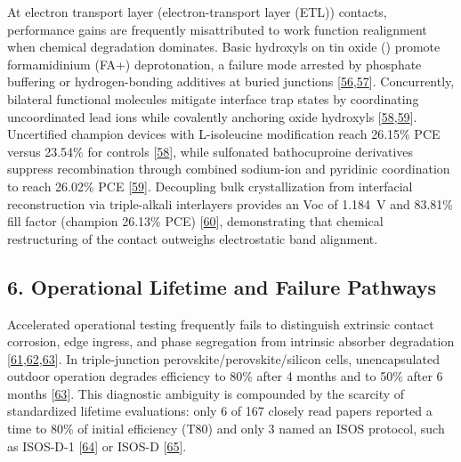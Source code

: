 \documentclass[
  11pt,
]{article}
\begin{document}
At electron transport layer (electron-transport layer (ETL)) contacts,
performance gains are frequently misattributed to work function
realignment when chemical degradation dominates. Basic hydroxyls on tin
oxide () promote formamidinium (FA+) deprotonation, a failure
mode arrested by phosphate buffering or hydrogen-bonding additives at
buried junctions
{[}\href{https://doi.org/10.1002/aenm.71170}{56},\href{https://doi.org/10.1021/acssuschemeng.6c04546}{57}{]}.
Concurrently, bilateral functional molecules mitigate interface trap
states by coordinating uncoordinated lead ions while covalently
anchoring oxide hydroxyls
{[}\href{https://doi.org/10.1002/smll.202510785}{58},\href{https://doi.org/10.1002/advs.76010}{59}{]}.
Uncertified champion devices with L-isoleucine modification reach
26.15\% PCE versus 23.54\% for controls
{[}\href{https://doi.org/10.1002/smll.202510785}{58}{]}, while
sulfonated bathocuproine derivatives suppress recombination through
combined sodium-ion and pyridinic coordination to reach 26.02\% PCE
{[}\href{https://doi.org/10.1002/advs.76010}{59}{]}. Decoupling bulk
crystallization from interfacial reconstruction via triple-alkali
interlayers provides an Voc of \qty{1.184}{\volt} and 83.81\% fill
factor (champion 26.13\% PCE)
{[}\href{https://doi.org/10.1002/adma.73535}{60}{]}, demonstrating that
chemical restructuring of the contact outweighs electrostatic band
alignment.

\subsection{6. Operational Lifetime and Failure
Pathways}\label{operational-lifetime-and-failure-pathways}

Accelerated operational testing frequently fails to distinguish
extrinsic contact corrosion, edge ingress, and phase segregation from
intrinsic absorber degradation
{[}\href{https://doi.org/10.1016/j.joule.2026.102538}{61},\href{https://doi.org/10.1021/acsenergylett.6c00904}{62},\href{https://doi.org/10.1002/solr.70390}{63}{]}.
In triple-junction perovskite/perovskite/silicon cells, unencapsulated
outdoor operation degrades efficiency to 80\% after 4 months and to 50\%
after 6 months {[}\href{https://doi.org/10.1002/solr.70390}{63}{]}. This
diagnostic ambiguity is compounded by the scarcity of standardized
lifetime evaluations: only 6 of 167 closely read papers reported a time
to 80\% of initial efficiency (T80) and only 3 named an ISOS protocol,
such as ISOS-D-1 {[}\href{https://doi.org/10.1021/acsaem.6c00778}{64}{]}
or ISOS-D {[}\href{https://doi.org/10.1016/j.cej.2026.177834}{65}{]}.
\end{document}

